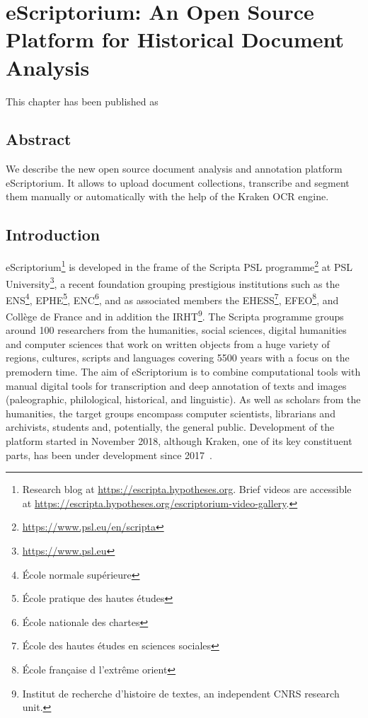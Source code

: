 \chapter{eScriptorium: An Open Source Platform for Historical Document Analysis}
\thispagestyle{empty}
\vfill
This chapter has been published as 
\newpage

\section*{Abstract}
We describe the new open source document analysis and annotation platform
eScriptorium. It allows to upload document collections, transcribe and segment
them manually or automatically with the help of the Kraken OCR engine.

\section{Introduction}

eScriptorium\footnote{Research blog at \url{https://escripta.hypotheses.org}.
Brief videos are accessible at
\url{https://escripta.hypotheses.org/escriptorium-video-gallery}.} is developed
in the frame of the Scripta PSL
programme\footnote{\url{https://www.psl.eu/en/scripta}} at PSL
University\footnote{\url{https://www.psl.eu}}, a recent foundation grouping
prestigious institutions such as the ENS\footnote{École normale supérieure},
EPHE\footnote{École pratique des hautes études}, ENC\footnote{École nationale
des chartes}, and as associated members the EHESS\footnote{École des hautes
études en sciences sociales}, EFEO\footnote{École française d l'extrême orient},
and Collège de France and in addition the IRHT\footnote{Institut de recherche
d’histoire de textes, an independent CNRS research unit.}. The Scripta
programme groups around 100 researchers from the humanities, social sciences,
digital humanities and computer sciences that work on written objects from a
huge variety of regions, cultures, scripts and languages covering 5500 years
with a focus on the premodern time. The aim of eScriptorium is to combine
computational tools with manual digital tools for transcription and deep
annotation of texts and images (paleographic, philological, historical, and
linguistic). As well as scholars from the humanities, the target groups
encompass computer scientists, librarians and archivists, students and,
potentially, the general public. Development of the platform started in
November 2018, although Kraken, one of its key constituent parts, has been
under development since 2017~\cite{kiessling2019kraken}.

